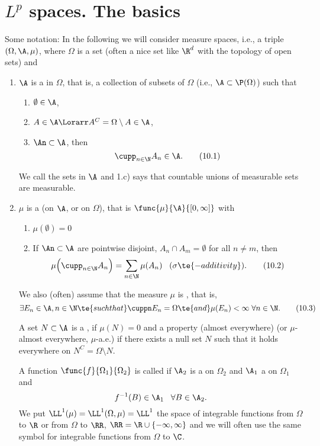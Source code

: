 \section{$L^p$ spaces. The basics}

Some notation: In the following we will consider measure spaces, i.e., a triple $(\Omega,\A,\mu)$, where $\Omega$ is a set (often a nice set like $\R^d$ with the topology of open sets) and
\begin{enumerate}[label=\arabic*)]
	\item $\A$ is a \rec{\bol{\si}} in $\Omega$, that is, a collection of subsets of $\Omega$ (i.e., $\A\subset\P(\Omega)$) such that
	\begin{enumerate}[label=1.\alph*)]
		\item $\emptyset\in\A$,
		\item $A\in\A\Lorarr A^C=\Omega\setminus A\in\A$,
		\item $\An\subset\A$, then 
		\[\cupp_{n\in\N}A_n\in\A.\tag{10.1}\label{10.1}\]
	\end{enumerate}
	We call the sets in $\A$  and 1.c) says that countable unions of measurable sets are measurable.
	
	\item $\mu$ is a  (on $\A$, or on $\Omega$), that is $\func{\mu}{\A}{[0,\infty]}$ with
	\begin{enumerate}[label=2.\alph*)]
		\item $\mu(\emptyset)=0$
		\item If $\An\subset\A$ are pointwise disjoint, $A_n\cap A_m=\emptyset$ for all $n\neq m$, then
		\[\mu\Big(\cupp_{n\in\N}A_n\Big)=\sum_{n\in\N}\mu(A_n)\;\;\;(\sigma\te{-additivity}).\tag{10.2}\label{10.2}\]
	\end{enumerate} 
	We also (often) assume that the measure $\mu$ is , that is,
	\[\exists E_n\in\A,n\in\N\te{ such that }\cuppn E_n=\Omega\te{ and }\mu(E_n)<\infty\;\forall n\in\N.\tag{10.3}\label{10.3}\]
	
	A set $N\subset\A$ is a , if $\mu(N)=0$ and a property  (almost everywhere) (or $\mu$-almost everywhere, $\mu$-a.e.) if there exists a null set $N$ such that it holds everywhere on $N^C=\Omega\setminus N$.\vspace{1.5mm}
	
	A function $\func{f}{\Omega_1}{\Omega_2}$ is called  if $\A_2$ is a \si on $\Omega_2$ and $\A_1$ a \si on $\Omega_1$ and 
	\[f^{-1}(B)\in\A_1\;\;\;\forall B\in\A_2.\]
	We put $\LL^1(\mu)=\LL^1(\Omega,\mu)=\LL^1$ the space of integrable functions from $\Omega$ to $\R$ or from $\Omega$ to $\RR$, $\RR=\R\cup\{-\infty,\infty\}$ and we will often use the same symbol for integrable functions from $\Omega$ to $\C$. 
	

\end{enumerate}
